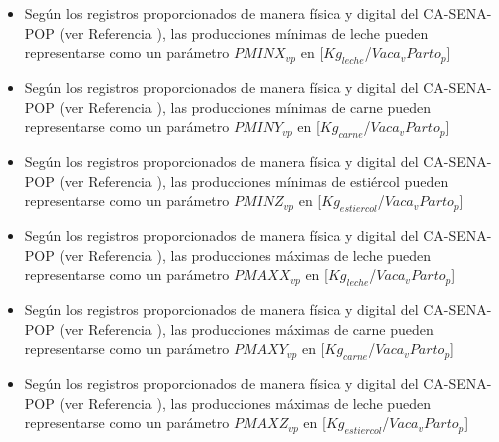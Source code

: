 \begin{itemize}
    \item Según los registros proporcionados de manera física y digital del CA-SENA-POP (ver Referencia \cite{casena}), las producciones mínimas de leche pueden representarse como un parámetro $PMINX_{vp}$ en [$Kg_{leche}$/$Vaca_{v}Parto_{p}$]
    \item Según los registros proporcionados de manera física y digital del CA-SENA-POP (ver Referencia \cite{casena}), las producciones mínimas de carne pueden representarse como un parámetro $PMINY_{vp}$ en [$Kg_{carne}$/$Vaca_{v}Parto_{p}$]
    \item Según los registros proporcionados de manera física y digital del CA-SENA-POP (ver Referencia \cite{casena}), las producciones mínimas de estiércol pueden representarse como un parámetro $PMINZ_{vp}$ en [$Kg_{estiercol}$/$Vaca_{v}Parto_{p}$]
    \item Según los registros proporcionados de manera física y digital del CA-SENA-POP (ver Referencia \cite{casena}), las producciones máximas de leche pueden representarse como un parámetro $PMAXX_{vp}$ en [$Kg_{leche}$/$Vaca_{v}Parto_{p}$]
     \item Según los registros proporcionados de manera física y digital del CA-SENA-POP (ver Referencia \cite{casena}), las producciones máximas de carne pueden representarse como un parámetro $PMAXY_{vp}$ en [$Kg_{carne}$/$Vaca_{v}Parto_{p}$]
      \item Según los registros proporcionados de manera física y digital del CA-SENA-POP (ver Referencia \cite{casena}), las producciones máximas de leche pueden representarse como un parámetro $PMAXZ_{vp}$ en [$Kg_{estiercol}$/$Vaca_{v}Parto_{p}$]
\end{itemize}

